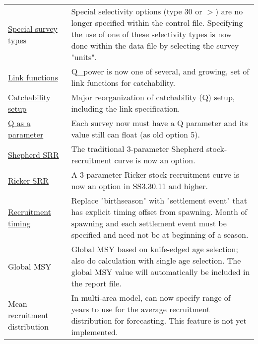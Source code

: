 \begin{center}
{\begin{longtable}{p{1.75cm} p{9.5cm}}
		\multicolumn{1}{l}{\hyperlink{SpecialSurvey}{Special survey types}} & 
				Special selectivity options (type 30 or $>$) are no longer specified within the control file.  Specifying the use of one of these selectivity types is now done within the data file by selecting the survey "units". \\  

		\multicolumn{1}{l}{\hyperlink{Qsetup}{Link functions}} & 
				Q\_power is now one of several, and growing, set of link functions for catchability. \\
				
		\multicolumn{1}{l}{\hyperlink{Qsetup}{Catchability setup}} & 
				Major reorganization of catchability (Q) setup, including the link specification. \\
			
		\multicolumn{1}{l}{\hyperlink{Qsetup}{Q as a parameter}} & 
				Each survey now must have a Q parameter and its value still can float (as old option 5).\\

		\multicolumn{1}{l}{\hyperlink{Shepherd}{Shepherd SRR}} & 
				The traditional 3-parameter Shepherd stock-recruitment curve is now an option.\\

			
		\multicolumn{1}{l}{\hyperlink{Ricker2}{Ricker SRR}} & 
				A 3-parameter Ricker stock-recruitment curve is now an option in SS3.30.11 and higher.\\

		\multicolumn{1}{l}{\hyperlink{RecrTiming}{Recruitment timing}} & 
				Replace "birthseason" with "settlement event" that has explicit timing offset from spawning. Month of spawning and each settlement event must be specified and need not be at beginning of a season.\\

		\multicolumn{1}{l}{Global MSY} &  
				Global MSY based on knife-edged age selection; also do calculation with single age selection. The global MSY value will automatically be included in the report file.\\
		
		\multicolumn{1}{l}{ Mean recruitment distribution} & 
				In multi-area model, can now specify range of years to use for the average recruitment distribution for forecasting. This feature is not yet implemented. \\


\end{longtable}}
\end{center}
